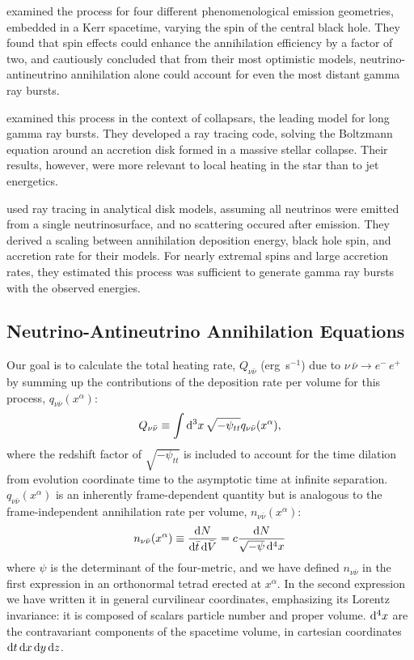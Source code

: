 \cite{birk2007-nunubar} examined the process for four different phenomenological
emission geometries, embedded in a Kerr spacetime, varying the spin of the
central black hole. They found that spin effects could enhance the annihilation
efficiency by a factor of two, and cautiously concluded that from their most
optimistic models, neutrino-antineutrino annihilation alone could account for
even the most distant gamma ray bursts.

\cite{hari2010-gr_nunubar_collapsar} examined this process in the context of
collapsars,
the leading model for long gamma ray bursts. They developed a ray tracing code,
solving the Boltzmann equation around an accretion disk formed in a massive
stellar collapse. Their results, however, were more relevant to local heating
in the star than to jet energetics.

\cite{zala2011-nunubar} used ray tracing in analytical disk models, assuming
all neutrinos were emitted from a single neutrinosurface, and no scattering
occured after emission. They derived a scaling between annihilation deposition
energy, black hole spin, and accretion rate for their models. For nearly
extremal spins and large accretion rates, they estimated this process was
sufficient to generate gamma ray bursts with the observed energies.

\subsection{Neutrino-Antineutrino Annihilation Equations}
\label{ssec:nunubar_integral}
Our goal is to calculate the total heating rate, $Q_{\nu \bar{\nu}}$ (erg~s$^{-1}$)
due to $\nu\,\bar{\nu} \rightarrow e^{-}\,e^{+}$ by summing up the contributions
of the deposition rate per volume for this process,
$q_{\nu \bar{\nu}}(x^\alpha)$:
\begin{equation}
  \label{eqn:Q_vol}
  Q_{\nu \bar{\nu}} \equiv \int \mathrm{d}^3 x\,\sqrt{-\psi_{tt}}q_{\nu \bar{\nu}}(x^\alpha),
\end{equation}
where the redshift factor of $\sqrt{-\psi_{tt}}$ is included to account for the time
dilation from evolution coordinate time to the asymptotic time at infinite separation.
$q_{\nu \bar{\nu}}(x^\alpha)$ is an inherently frame-dependent quantity but is
analogous to the frame-independent annihilation rate per volume,
$n_{\nu \bar{\nu}}(x^\alpha)$:
\begin{equation}
  n_{\nu \bar{\nu}}(x^\alpha) \equiv
  \frac{\mathrm{d} N}{\mathrm{d} \bar{t} \, \mathrm{d} \bar{V}} =
  c \frac{\mathrm{d} N}{\sqrt{-\psi}\,\mathrm{d}^4 x}
\end{equation}
where $\psi$ is the determinant of the four-metric, and we have defined
$n_{\nu \bar{\nu}}$ in the first expression in an orthonormal tetrad erected at
$x^\alpha$. In the second expression we have written it in general curvilinear
coordinates, emphasizing its Lorentz invariance: it is composed of scalars
particle number and proper volume. $\mathrm{d}^4 x$ are the contravariant components
of the spacetime volume, in cartesian coordinates
$\mathrm{d} t \, \mathrm{d} x \, \mathrm{d} y \, \mathrm{d} z$.

